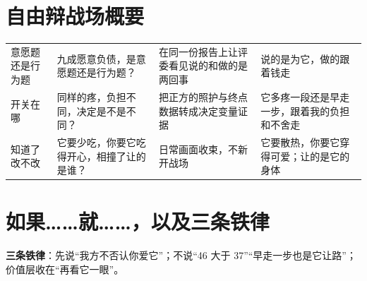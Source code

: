 \documentclass[quick,con]{debate}
\begin{document}
\section{自由辩战场概要}
\begin{tabularx}{\linewidth}{@{}L{6em}Y Y Y@{}}\toprule
{}&&&\\\midrule
意愿题还是行为题&九成愿意负债，是意愿题还是行为题？&在同一份报告上让评委看见说的和做的是两回事&说的是为它，做的跟着钱走\\
开关在哪&同样的疼，负担不同，决定是不是不同？&把正方的照护与终点数据转成决定变量证据&它多疼一段还是早走一步，跟着我的负担和不舍走\\
知道了改不改&它要少吃，你要它吃得开心，相撞了让的是谁？&日常画面收束，不新开战场&它要散热，你要它穿得可爱；让的是它的身体\\
\bottomrule\end{tabularx}
\section{如果……就……，以及三条铁律}
\begin{contingency}
\end{contingency}
\textbf{三条铁律}：先说“我方不否认你爱它”；不说“46 大于 37”“早走一步也是它让路”；价值层收在“再看它一眼”。
\end{document}
